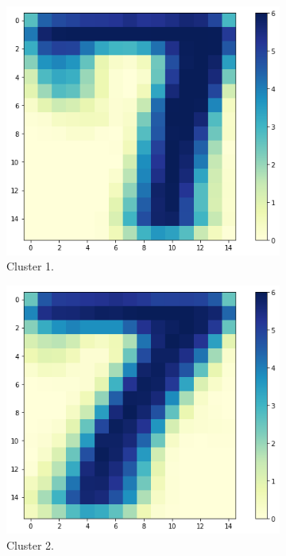 \documentclass{article}
\begin{document}
\begin{figure}[h!]
    \centering
    \begin{subfigure}[b]{0.4\linewidth}
      \includegraphics[scale=0.4]{images/codebook_cluster3_1.png}
      \caption{Cluster 1.}
    \end{subfigure}\hspace{20.0}%
      \begin{subfigure}[b]{0.4\linewidth}
      \includegraphics[scale=0.4]{images/codebook_cluster3_2.png}
      \caption{Cluster 2.}
    \end{subfigure}\\[1ex]
    \begin{subfigure}[b]{0.4\linewidth}

\end{subfigure}
\end{figure}
\end{document}
